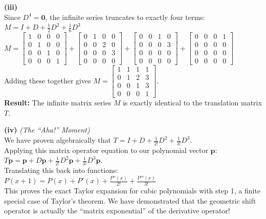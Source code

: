\begin{solution}
\medskip
\textbf{(iii)} \\
Since $D^4 = \mathbf{0}$, the infinite series truncates to exactly four terms: \\
$M = I + D + \frac{1}{2}D^2 + \frac{1}{6}D^3$ \\
$M = \begin{bmatrix} 1 & 0 & 0 & 0 \\ 0 & 1 & 0 & 0 \\ 0 & 0 & 1 & 0 \\ 0 & 0 & 0 & 1 \end{bmatrix} + \begin{bmatrix} 0 & 1 & 0 & 0 \\ 0 & 0 & 2 & 0 \\ 0 & 0 & 0 & 3 \\ 0 & 0 & 0 & 0 \end{bmatrix} + \begin{bmatrix} 0 & 0 & 1 & 0 \\ 0 & 0 & 0 & 3 \\ 0 & 0 & 0 & 0 \\ 0 & 0 & 0 & 0 \end{bmatrix} + \begin{bmatrix} 0 & 0 & 0 & 1 \\ 0 & 0 & 0 & 0 \\ 0 & 0 & 0 & 0 \\ 0 & 0 & 0 & 0 \end{bmatrix}$ \\
Adding these together gives $M = \begin{bmatrix} 1 & 1 & 1 & 1 \\ 0 & 1 & 2 & 3 \\ 0 & 0 & 1 & 3 \\ 0 & 0 & 0 & 1 \end{bmatrix}$. \\
\textbf{Result:} The infinite matrix series $M$ is exactly identical to the translation matrix $T$.

\medskip
\textbf{(iv)} \textit{(The ``Aha!'' Moment)} \\
We have proven algebraically that $T = I + D + \frac{1}{2!}D^2 + \frac{1}{3!}D^3$. \\
Applying this matrix operator equation to our polynomial vector $\mathbf{p}$: \\
$T\mathbf{p} = \mathbf{p} + D\mathbf{p} + \frac{1}{2!}D^2\mathbf{p} + \frac{1}{3!}D^3\mathbf{p}$. \\
Translating this back into functions: \\
\textbf{$P(x+1) = P(x) + P'(x) + \frac{P''(x)}{2!} + \frac{P'''(x)}{3!}$} \\
This proves the exact Taylor expansion for cubic polynomials with step 1, a finite special case of Taylor's theorem. We have demonstrated that the geometric shift operator is actually the ``matrix exponential'' of the derivative operator!
\end{solution}

